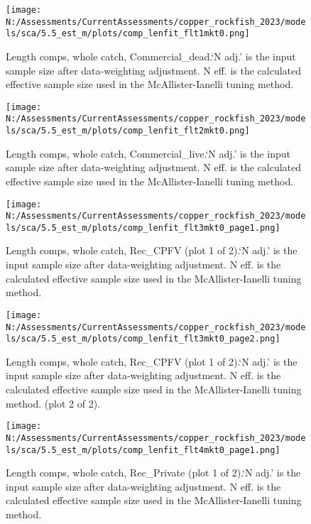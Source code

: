 \documentclass[11pt,
  english,
  letterpaper,
]{article}
\begin{document}
\begin{figure}
\centering
\texttt{[image: N:/Assessments/CurrentAssessments/copper\_rockfish\_2023/models/sca/5.5\_est\_m/plots/comp\_lenfit\_flt1mkt0.png]}
\caption{Length comps, whole catch, Commercial\_dead.`N adj.' is the input sample size after data-weighting adjustment. N eff. is the calculated effective sample size used in the McAllister-Ianelli tuning method.\label{fig:comp_lenfit_flt1mkt0}}
\end{figure}

\begin{figure}
\centering
\texttt{[image: N:/Assessments/CurrentAssessments/copper\_rockfish\_2023/models/sca/5.5\_est\_m/plots/comp\_lenfit\_flt2mkt0.png]}
\caption{Length comps, whole catch, Commercial\_live.`N adj.' is the input sample size after data-weighting adjustment. N eff. is the calculated effective sample size used in the McAllister-Ianelli tuning method.\label{fig:comp_lenfit_flt2mkt0}}
\end{figure}

\begin{figure}
\centering
\texttt{[image: N:/Assessments/CurrentAssessments/copper\_rockfish\_2023/models/sca/5.5\_est\_m/plots/comp\_lenfit\_flt3mkt0\_page1.png]}
\caption{Length comps, whole catch, Rec\_CPFV (plot 1 of 2).`N adj.' is the input sample size after data-weighting adjustment. N eff. is the calculated effective sample size used in the McAllister-Ianelli tuning method.\label{fig:comp_lenfit_flt3mkt0_page1}}
\end{figure}

\begin{figure}
\centering
\texttt{[image: N:/Assessments/CurrentAssessments/copper\_rockfish\_2023/models/sca/5.5\_est\_m/plots/comp\_lenfit\_flt3mkt0\_page2.png]}
\caption{Length comps, whole catch, Rec\_CPFV (plot 1 of 2).`N adj.' is the input sample size after data-weighting adjustment. N eff. is the calculated effective sample size used in the McAllister-Ianelli tuning method. (plot 2 of 2).\label{fig:comp_lenfit_flt3mkt0_page2}}
\end{figure}

\begin{figure}
\centering
\texttt{[image: N:/Assessments/CurrentAssessments/copper\_rockfish\_2023/models/sca/5.5\_est\_m/plots/comp\_lenfit\_flt4mkt0\_page1.png]}
\caption{Length comps, whole catch, Rec\_Private (plot 1 of 2).`N adj.' is the input sample size after data-weighting adjustment. N eff. is the calculated effective sample size used in the McAllister-Ianelli tuning method.\label{fig:comp_lenfit_flt4mkt0_page1}}
\end{figure}
\end{document}

